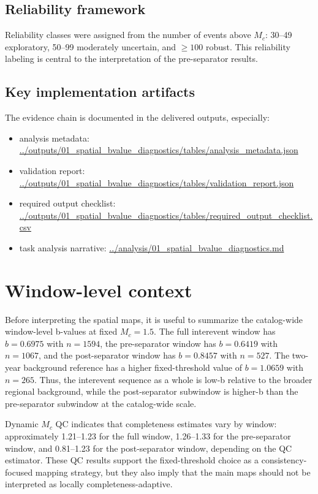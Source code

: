 \documentclass[11pt]{article}
\begin{document}
\subsection{Reliability framework}
Reliability classes were assigned from the number of events above $M_c$: 30--49 exploratory, 50--99 moderately uncertain, and $\ge 100$ robust. This reliability labeling is central to the interpretation of the pre-separator results.

\subsection{Key implementation artifacts}
The evidence chain is documented in the delivered outputs, especially:
\begin{itemize}[leftmargin=1.5em]
\item analysis metadata: \url{../outputs/01_spatial_bvalue_diagnostics/tables/analysis_metadata.json}
\item validation report: \url{../outputs/01_spatial_bvalue_diagnostics/tables/validation_report.json}
\item required output checklist: \url{../outputs/01_spatial_bvalue_diagnostics/tables/required_output_checklist.csv}
\item task analysis narrative: \url{../analysis/01_spatial_bvalue_diagnostics.md}
\end{itemize}

\section{Window-level context}
Before interpreting the spatial maps, it is useful to summarize the catalog-wide window-level b-values at fixed $M_c=1.5$. The full interevent window has $b=0.6975$ with $n=1594$, the pre-separator window has $b=0.6419$ with $n=1067$, and the post-separator window has $b=0.8457$ with $n=527$. The two-year background reference has a higher fixed-threshold value of $b=1.0659$ with $n=265$. Thus, the interevent sequence as a whole is low-b relative to the broader regional background, while the post-separator subwindow is higher-b than the pre-separator subwindow at the catalog-wide scale.

Dynamic $M_c$ QC indicates that completeness estimates vary by window: approximately 1.21--1.23 for the full window, 1.26--1.33 for the pre-separator window, and 0.81--1.23 for the post-separator window, depending on the QC estimator. These QC results support the fixed-threshold choice as a consistency-focused mapping strategy, but they also imply that the main maps should not be interpreted as locally completeness-adaptive.
\end{document}
